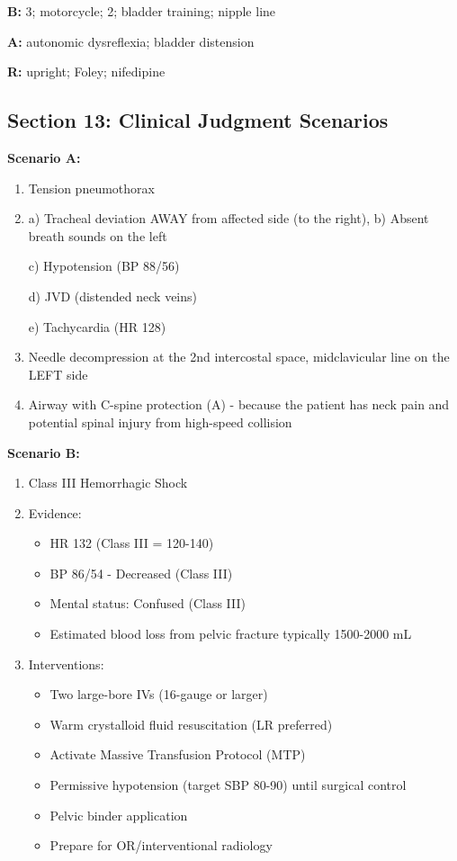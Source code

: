 \documentclass[11pt]{article}
\begin{document}
\textbf{B:} 3; motorcycle; 2; bladder training; nipple line

\textbf{A:} autonomic dysreflexia; bladder distension

\textbf{R:} upright; Foley; nifedipine

\subsection*{Section 13: Clinical Judgment Scenarios}

\textbf{Scenario A:}
\begin{enumerate}
    \item Tension pneumothorax
    \item a) Tracheal deviation AWAY from affected side (to the right),
b) Absent breath sounds on the left
    
    c) Hypotension (BP 88/56)
    
    d) JVD (distended neck veins)
    
    e) Tachycardia (HR 128)
    
    \item Needle decompression at the 2nd intercostal space, midclavicular line on the LEFT side
    
    \item Airway with C-spine protection (A) - because the patient has neck pain and potential spinal injury from high-speed collision
\end{enumerate}

\textbf{Scenario B:}
\begin{enumerate}
    \item Class III Hemorrhagic Shock
    
    \item Evidence:
    \begin{itemize}
        \item HR 132 (Class III = 120-140)
        \item BP 86/54 - Decreased (Class III)
        \item Mental status: Confused (Class III)
        \item Estimated blood loss from pelvic fracture typically 1500-2000 mL
    \end{itemize}
    
    \item Interventions:
    \begin{itemize}
        \item Two large-bore IVs (16-gauge or larger)
        \item Warm crystalloid fluid resuscitation (LR preferred)
        \item Activate Massive Transfusion Protocol (MTP)
        \item Permissive hypotension (target SBP 80-90) until surgical control
        \item Pelvic binder application
        \item Prepare for OR/interventional radiology
    \end{itemize}
\end{enumerate}
\end{document}
